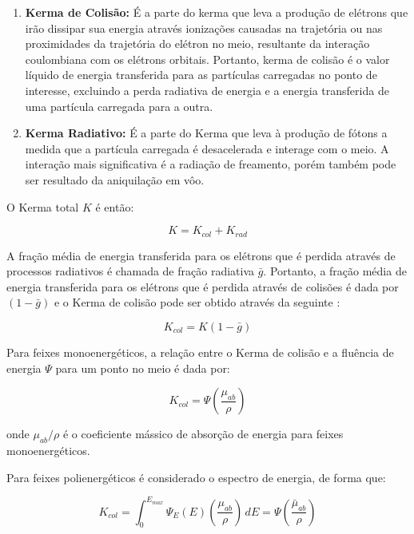 \documentclass[11pt,a4paper]{article}
\begin{document}
		\begin{enumerate}
			\item \textcolor{CarnationPink}{\textbf{Kerma de Colisão:}} É a parte do kerma que leva a produção de elétrons que irão dissipar sua energia através ionizações causadas na trajetória ou nas proximidades da trajetória do elétron no meio, resultante da interação coulombiana com os elétrons orbitais. Portanto, kerma de colisão é o valor líquido de energia transferida para as partículas carregadas no ponto de interesse, excluindo a perda radiativa de energia e a energia transferida de uma partícula carregada para a outra.
			
			\item \textcolor{CarnationPink}{\textbf{Kerma Radiativo:}} É a parte do Kerma que leva à produção de fótons a medida que a partícula carregada é desacelerada e interage com o meio. A interação mais significativa é a radiação de freamento, porém também pode ser resultado da aniquilação em vôo.
		\end{enumerate}


		O Kerma total $K$ é então:

			\begin{equation}
				K = K_{col} + K_{rad}
			\end{equation}

		A fração média de energia transferida para os elétrons que é perdida através de processos radiativos é chamada de fração radiativa $\bar{g}$. Portanto, a fração média de energia transferida para os elétrons que é perdida através de colisões é dada por $(1 - \bar{g})$ e o Kerma de colisão pode ser obtido através da seguinte  :

			\begin{equation}
				K_{col} = K(1 - \bar{g})
			\end{equation}

		Para feixes monoenergéticos, a relação entre o Kerma de colisão e a fluência de energia $\Psi$ para um ponto no meio é dada por:

			\begin{equation}
				K_{col} = \Psi \left(\frac{\mu_{ab}}{\rho}\right)
			\end{equation}

		\noindent onde $\mu_{ab}/\rho$ é o coeficiente mássico de absorção de energia para feixes monoenergéticos. 

		Para feixes polienergéticos é considerado o espectro de energia, de forma que:

			\begin{equation}
				K_{col} = \int_{0}^{E_{max}} \Psi_E(E) \left(\frac{\mu_{ab}}{\rho}\right)  \,dE 
				= \Psi \left(\frac{\bar{\mu}_{ab}}{\rho}\right)
			\end{equation}
\end{document}
